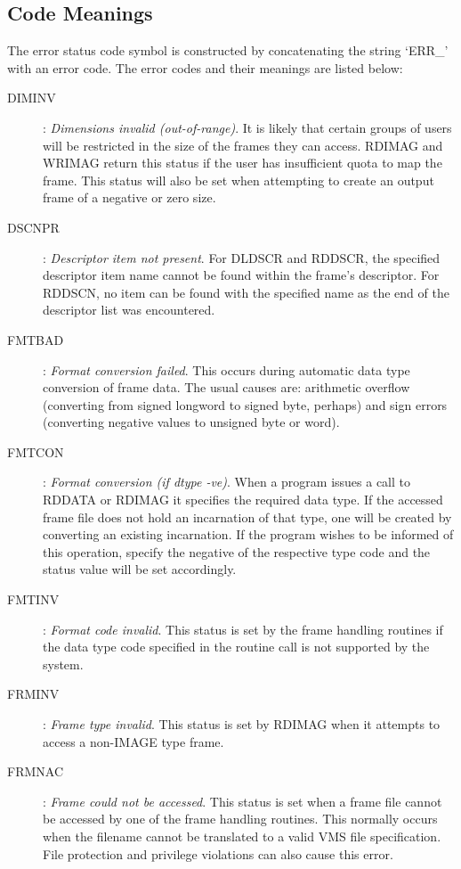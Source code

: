 \subsection {Code Meanings}
The error status code symbol is constructed by concatenating the string
`ERR\_' with an error code.
The error codes and their meanings are listed below:
\begin{description}
\item [DIMINV]:
{\em Dimensions invalid (out-of-range)}.
It is likely that certain groups of users will be restricted in the size of the
frames they can access.
RDIMAG and WRIMAG return this status if the user has insufficient quota to map
the frame.
This status will also be set when attempting to create an output frame of a
negative or zero size.
\item [DSCNPR]:
{\em Descriptor item not present}.
For DLDSCR and RDDSCR, the specified descriptor item name cannot be found within
the frame's descriptor.
For RDDSCN, no item can be found with the specified name as the end of the
descriptor list was encountered.
\item [FMTBAD]:
{\em Format conversion failed}.
This occurs during automatic data type conversion of frame data.
The usual causes are: arithmetic overflow (converting from signed longword to
signed byte, perhaps) and sign errors (converting negative values to unsigned
byte or word).
\item [FMTCON]:
{\em Format conversion (if dtype -ve)}.
When a program issues a call to RDDATA or RDIMAG it specifies the required data
type.
If the accessed frame file does not hold an incarnation of that type, one will
be created by converting an existing incarnation.
If the program wishes to be informed of this operation, specify the negative of
the respective type code and the status value will be set accordingly.
\item [FMTINV]:
{\em Format code invalid}.
This status is set by the frame handling routines if the data type code
specified in the routine call is not supported by the system.
\item [FRMINV]:
{\em Frame type invalid}.
This status is set by RDIMAG when it attempts to access a non-IMAGE type frame.
\item [FRMNAC]:
{\em Frame could not be accessed}.
This status is set when a frame file cannot be accessed by one of the frame
handling routines.
This normally occurs when the filename cannot be translated to a valid VMS file
specification.
File protection and privilege violations can also cause this error.

\end{description}
